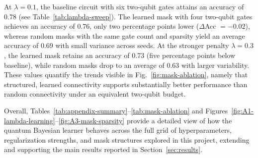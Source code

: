 \documentclass[conference]{IEEEtran}
\begin{document}
At $\lambda = 0.1$, the baseline circuit with six two-qubit gates attains an
accuracy of 0.78 (see Table~\ref{tab:lambda-sweep}). The learned mask with
four two-qubit gates achieves an accuracy of 0.76, only two percentage points
lower ($\Delta$Acc $=-0.02$), whereas random masks with the same gate count and
sparsity yield an average accuracy of 0.69 with small variance across seeds.
At the stronger penalty $\lambda=0.3$, the learned mask retains an accuracy of
0.73 (five percentage points below baseline), while random masks drop to an
average of 0.63 with larger variability. These values quantify the trends
visible in Fig.~\ref{fig:mask-ablation}, namely that structured, learned
connectivity supports substantially better performance than random connectivity
under an equivalent two-qubit budget.

Overall, Tables~\ref{tab:appendix-summary}--\ref{tab:mask-ablation} and
Figures~\ref{fig:A1-lambda-learning}--\ref{fig:A3-mask-sparsity} provide a
detailed view of how the quantum Bayesian learner behaves across the full grid
of hyperparameters, regularization strengths, and mask structures explored in
this project, extending and supporting the main results reported in
Section~\ref{sec:results}.
\end{document}
